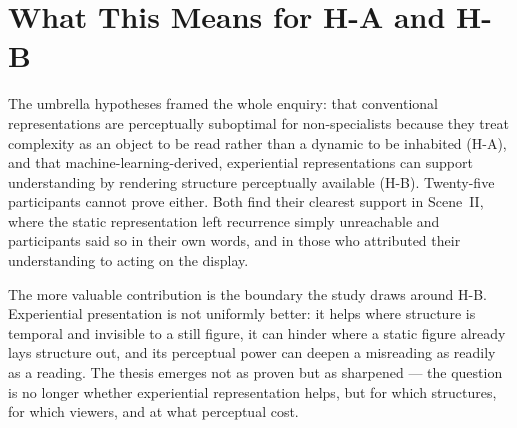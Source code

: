 \section{What This Means for H-A and H-B}
\label{sec:disc-umbrella}

The umbrella hypotheses framed the whole enquiry: that conventional representations are perceptually suboptimal for non-specialists because they treat complexity as an object to be read rather than a dynamic to be inhabited (H-A), and that machine-learning-derived, experiential representations can support understanding by rendering structure perceptually available (H-B). Twenty-five participants cannot prove either. Both find their clearest support in Scene~II, where the static representation left recurrence simply unreachable and participants said so in their own words, and in those who attributed their understanding to acting on the display.

The more valuable contribution is the boundary the study draws around H-B. Experiential presentation is not uniformly better: it helps where structure is temporal and invisible to a still figure, it can hinder where a static figure already lays structure out, and its perceptual power can deepen a misreading as readily as a reading. The thesis emerges not as proven but as sharpened --- the question is no longer whether experiential representation helps, but for which structures, for which viewers, and at what perceptual cost.